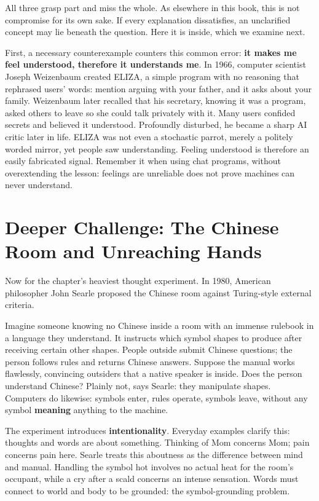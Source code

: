All three grasp part and miss the whole. As elsewhere in this book, this is not compromise for its own sake. If every explanation dissatisfies, an unclarified concept may lie beneath the question. Here it is inside, which we examine next.

First, a necessary counterexample counters this common error: \textbf{it makes me feel understood, therefore it understands me}. In 1966, computer scientist Joseph Weizenbaum created ELIZA, a simple program with no reasoning that rephrased users' words: mention arguing with your father, and it asks about your family. Weizenbaum later recalled that his secretary, knowing it was a program, asked others to leave so she could talk privately with it. Many users confided secrets and believed it understood. Profoundly disturbed, he became a sharp AI critic later in life. ELIZA was not even a stochastic parrot, merely a politely worded mirror, yet people saw understanding. Feeling understood is therefore an easily fabricated signal. Remember it when using chat programs, without overextending the lesson: feelings are unreliable does not prove machines can never understand.

\section[The Chinese Room and Unreaching Hands]{Deeper Challenge: The Chinese Room and Unreaching Hands}
Now for the chapter's heaviest thought experiment. In 1980, American philosopher John Searle proposed the Chinese room against Turing-style external criteria.

Imagine someone knowing no Chinese inside a room with an immense rulebook in a language they understand. It instructs which symbol shapes to produce after receiving certain other shapes. People outside submit Chinese questions; the person follows rules and returns Chinese answers. Suppose the manual works flawlessly, convincing outsiders that a native speaker is inside. Does the person understand Chinese? Plainly not, says Searle: they manipulate shapes. Computers do likewise: symbols enter, rules operate, symbols leave, without any symbol \textbf{meaning} anything to the machine.

The experiment introduces \textbf{intentionality}. Everyday examples clarify this: thoughts and words are about something. Thinking of Mom concerns Mom; pain concerns pain here. Searle treats this aboutness as the difference between mind and manual. Handling the symbol hot involves no actual heat for the room's occupant, while a cry after a scald concerns an intense sensation. Words must connect to world and body to be grounded: the symbol-grounding problem.

